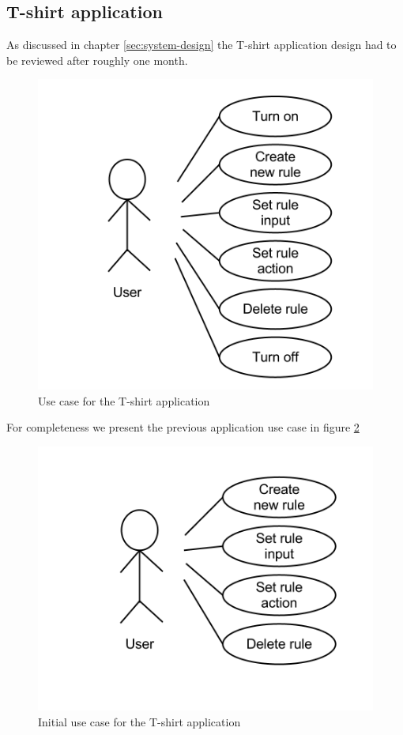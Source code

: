 \subsection{T-shirt application}

As discussed in chapter \ref{sec:system-design} the T-shirt application design had to be reviewed after roughly one month.

\begin{figure}[h!]
	\centering \includegraphics[scale=0.35]{img/design-tshirtappusecase2}
	\caption{Use case for the T-shirt application}
	\label{fig:design-tshirtappusecase2}
\end{figure}

For completeness we present the previous application use case in figure \ref{fig:design-tshirtappusecase1}

\begin{figure}[h!]
	\centering \includegraphics[scale=0.35]{img/design-tshirtappusecase1}
	\caption{Initial use case for the T-shirt application}
	\label{fig:design-tshirtappusecase1}
\end{figure}

